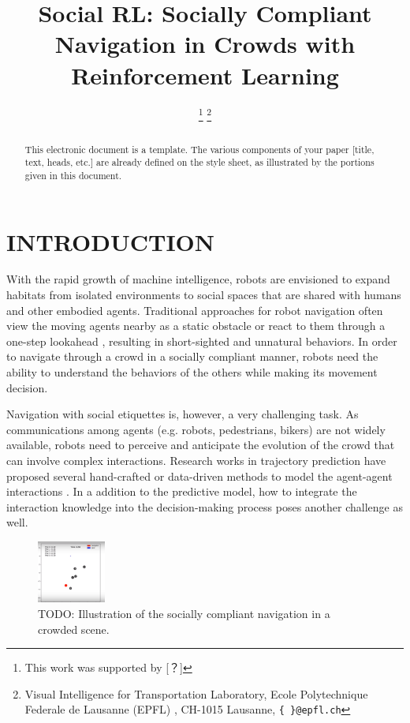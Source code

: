 \documentclass[letterpaper, 10 pt, conference]{ieeeconf}  %
\title{\Large \bf Social RL: Socially Compliant Navigation in Crowds
with Reinforcement Learning}
\author{%
\thanks{This work was supported by [？]}%
\thanks{Visual Intelligence for Transportation Laboratory, Ecole Polytechnique Federale de Lausanne (EPFL)
, CH-1015 Lausanne,
        {\tt\small \{ \}@epfl.ch}}%
}
\begin{document}

\maketitle
\thispagestyle{empty}
\pagestyle{empty}

\begin{abstract}
This electronic document is a template. The various components of your paper [title, text, heads, etc.] are already defined on the style sheet, as illustrated by the portions given in this document.

\vspace{5cm}

\end{abstract}


\section{INTRODUCTION} \label{sec:intro}

With the rapid growth of machine intelligence, robots are envisioned to expand habitats from isolated environments to social spaces that are shared with humans and other embodied agents. Traditional approaches for robot navigation often view the moving agents nearby as a static obstacle \cite{fox_dynamic_1997} or react to them through a one-step lookahead \cite{berg_reciprocal_2008}, resulting in short-sighted and unnatural behaviors. In order to navigate through a crowd in a socially compliant manner, robots need the ability to understand the behaviors of the others while making its movement decision. 

Navigation with social etiquettes is, however, a very challenging task. As communications among agents (e.g. robots, pedestrians, bikers) are not widely available, robots need to perceive and anticipate the evolution of the crowd that can involve complex interactions. Research works in trajectory prediction have proposed several hand-crafted or data-driven methods to model the agent-agent interactions \cite{helbing_social_1995,alahi_social_2016,vemula_social_2017,gupta_social_2018}. In a addition to the predictive model, how to integrate the interaction knowledge into the decision-making process poses another challenge as well. 

\begin{figure} [t]
  \captionsetup{font=small}
  \includegraphics[width=0.2\textwidth]{figures/overview}
  \caption{TODO: Illustration of the socially compliant navigation in a crowded scene.}
  \label{fig:overview}
\end{figure}
\end{document}

